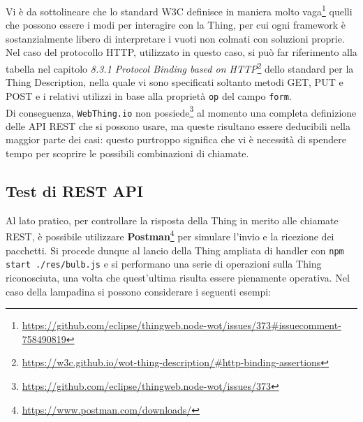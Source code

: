 \documentclass[12pt,a4paper,openright,oneside]{report}
\begin{document}
Vi è da sottolineare che lo standard W3C definisce in maniera molto vaga\footnote{\url{https://github.com/eclipse/thingweb.node-wot/issues/373\#issuecomment-758490819}} quelli che possono essere i modi per interagire con la Thing, per cui ogni framework è sostanzialmente libero di interpretare i vuoti non colmati con soluzioni proprie. Nel caso del protocollo HTTP, utilizzato in questo caso, si può far riferimento alla tabella nel capitolo \textit{8.3.1 Protocol Binding based on HTTP}\footnote{\url{https://w3c.github.io/wot-thing-description/\#http-binding-assertions}} dello standard per la Thing Description, nella quale vi sono specificati soltanto metodi GET, PUT e POST e i relativi utilizzi in base alla proprietà \texttt{op} del campo \texttt{form}.\\

Di conseguenza, \texttt{WebThing.io} non possiede\footnote{\url{https://github.com/eclipse/thingweb.node-wot/issues/373}} al momento una completa definizione delle API REST che si possono usare, ma queste risultano essere deducibili nella maggior parte dei casi: questo purtroppo significa che vi è necessità di spendere tempo per scoprire le possibili combinazioni di chiamate.\\

\subsection{Test di REST API}
Al lato pratico, per controllare la risposta della Thing in merito alle chiamate REST, è possibile utilizzare \textbf{Postman}\footnote{\url{https://www.postman.com/downloads/}} per simulare l'invio e la ricezione dei pacchetti. Si procede dunque al lancio della Thing ampliata di handler con \texttt{npm start ./res/bulb.js} e si performano una serie di operazioni sulla Thing riconosciuta, una volta che quest'ultima risulta essere pienamente operativa. Nel caso della lampadina si possono considerare i seguenti esempi:
\end{document}
